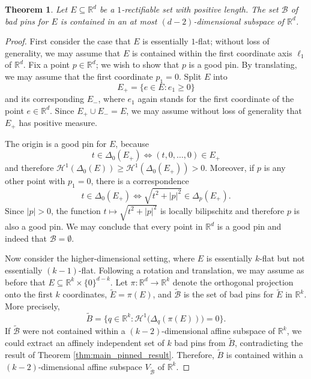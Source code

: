 \documentclass[12pt]{amsart}
\newtheorem{theorem}{Theorem}[section]
\theoremstyle{definition}
\numberwithin{equation}{section}
\newcommand{\R}{\mathbb{R}}
\begin{document}
\begin{theorem}\label{thm:pinned_distance_structural_bad}
    Let $E \subseteq \mathbb{R}^d$ be a $1$-rectifiable set with positive length. The set $\mathcal{B}$ of bad pins for $E$ is contained in an at most $(d-2)$-dimensional subspace of $\mathbb{R}^d$.
\end{theorem} 

\begin{proof}
First consider the case that $E$ is essentially $1$-flat; without loss of generality, we may assume that $E$ is contained within the first coordinate axis $\ell_1$ of $\mathbb{R}^d$. Fix a point $p \in \mathbb{R}^d$; we wish to show that $p$ is a good pin. By translating, we may assume that the first coordinate $p_1 = 0$. Split $E$ into
$$E_+ = \{e \in E : e_1 \ge 0\}$$
and its corresponding $E_-$, where $e_1$ again stands for the first coordinate of the point $e \in \mathbb{R}^d$. Since $E_+ \cup E_- = E$, we may assume without loss of generality that $E_+$ has positive measure.

The origin is a good pin for $E$, because
$$t \in \Delta_0(E_+) \iff (t, 0, \dots, 0) \in E_+$$
and therefore $\mathcal H^1(\Delta_0(E))\geq \mathcal H^1(\Delta_0(E_+)) > 0$. Moreover, if $p$ is any other point with $p_1 = 0$, there is a correspondence
$$t \in \Delta_0(E_+) \iff \sqrt{t^2 + |p|^2} \in \Delta_p(E_+).$$
Since $|p| > 0$, the function $t \mapsto \sqrt{t^2 + |p|^2}$ is locally bilipschitz and therefore $p$ is also a good pin. We may conclude that every point in $\mathbb{R}^d$ is a good pin and indeed that $\mathcal{B} = \emptyset$.

Now consider the higher-dimensional setting, where $E$ is essentially $k$-flat but not essentially $(k - 1)$-flat. Following a rotation and translation, we may assume as before that $E \subseteq \mathbb{R}^{k} \times \{0\}^{d - k}$. Let $\pi : \mathbb{R}^d \to \mathbb{R}^k$ denote the orthogonal projection onto the first $k$ coordinates, $\widetilde{E} = \pi(E)$, and $\widetilde{\mathcal{B}}$ is the set of bad pins for $\widetilde{E}$ in $\mathbb{R}^k$. More precisely,
\[
\widetilde{B} = \{q \in \R^k : \mathcal H^1\big(\Delta_q(\pi(E))\big) = 0 \}.
\]
If $\widetilde{\mathcal{B}}$ were not contained within a $(k - 2)$-dimensional affine subspace of $\mathbb{R}^k$, we could extract an affinely independent set of $k$ bad pins from $\widetilde{B}$, contradicting the result of Theorem \ref{thm:main_pinned_result}. Therefore, $\widetilde{B}$ is contained within a $(k - 2)$-dimensional affine subspace $V_{\widetilde{\mathcal B}}$ of $\mathbb{R}^k$. 


\end{proof}
\end{document}
